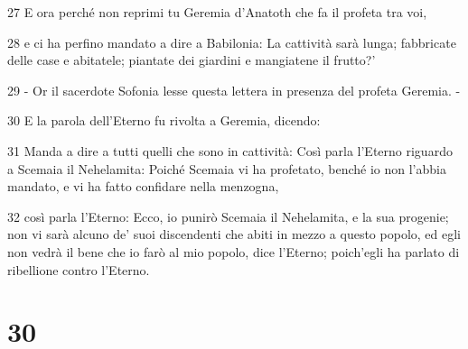 \par 27 E ora perché non reprimi tu Geremia d'Anatoth che fa il profeta tra voi,
\par 28 e ci ha perfino mandato a dire a Babilonia: La cattività sarà lunga; fabbricate delle case e abitatele; piantate dei giardini e mangiatene il frutto?'
\par 29 - Or il sacerdote Sofonia lesse questa lettera in presenza del profeta Geremia. -
\par 30 E la parola dell'Eterno fu rivolta a Geremia, dicendo:
\par 31 Manda a dire a tutti quelli che sono in cattività: Così parla l'Eterno riguardo a Scemaia il Nehelamita: Poiché Scemaia vi ha profetato, benché io non l'abbia mandato, e vi ha fatto confidare nella menzogna,
\par 32 così parla l'Eterno: Ecco, io punirò Scemaia il Nehelamita, e la sua progenie; non vi sarà alcuno de' suoi discendenti che abiti in mezzo a questo popolo, ed egli non vedrà il bene che io farò al mio popolo, dice l'Eterno; poich'egli ha parlato di ribellione contro l'Eterno.

\chapter{30}

